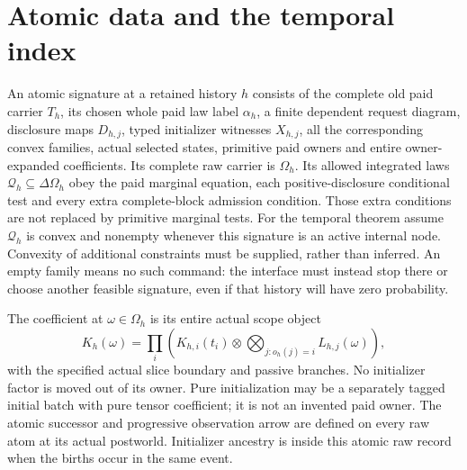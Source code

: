 \documentclass[11pt]{article}\usepackage{amsmath,amssymb,amsthm,geometry}\geometry{margin=1in}
\begin{document}
\section{Atomic data and the temporal index}
An atomic signature at a retained history $h$ consists of the complete old paid carrier $T_h$, its chosen whole paid law label $\alpha_h$, a finite dependent request diagram, disclosure maps $D_{h,j}$, typed initializer witnesses $X_{h,j}$, all the corresponding convex families, actual selected states, primitive paid owners and entire owner-expanded coefficients. Its complete raw carrier is $\Omega_h$. Its allowed integrated laws $\mathcal Q_h\subseteq\Delta\Omega_h$ obey the paid marginal equation, each positive-disclosure conditional test and every extra complete-block admission condition. Those extra conditions are not replaced by primitive marginal tests. For the temporal theorem assume $\mathcal Q_h$ is convex and nonempty whenever this signature is an active internal node. Convexity of additional constraints must be supplied, rather than inferred. An empty family means no such command: the interface must instead stop there or choose another feasible signature, even if that history will have zero probability.

The coefficient at $\omega\in\Omega_h$ is its entire actual scope object
\[
 K_h(\omega)=\prod_i\left(K_{h,i}(t_i)\otimes
                   \bigotimes_{j:o_h(j)=i}L_{h,j}(\omega)\right),       \tag{1}
\]
with the specified actual slice boundary and passive branches. No initializer factor is moved out of its owner. Pure initialization may be a separately tagged initial batch with pure tensor coefficient; it is not an invented paid owner. The atomic successor and progressive observation arrow are defined on every raw atom at its actual postworld. Initializer ancestry is inside this atomic raw record when the births occur in the same event.
\end{document}
